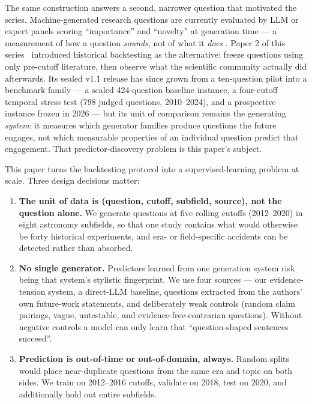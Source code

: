 \documentclass[11pt]{article}
\begin{document}
The same construction answers a second, narrower question that motivated the
series. Machine-generated research questions are currently evaluated by LLM
or expert panels scoring ``importance'' and ``novelty'' at generation time
--- a measurement of how a question \emph{sounds}, not of what it
\emph{does} \cite{si2024}. Paper 2 of this series~\cite{paper2} introduced
historical backtesting as the alternative: freeze questions using only
pre-cutoff literature, then
observe what the scientific community actually did afterwards. Its
sealed v1.1 release has since grown from a ten-question pilot into a
benchmark family --- a scaled 424-question baseline instance, a
four-cutoff temporal stress test (798 judged questions, 2010--2024), and
a prospective instance frozen in 2026 --- but its unit of comparison
remains the generating \emph{system}: it measures which generator
families produce questions the future engages, not which measurable
properties of an individual question predict that engagement. That
predictor-discovery problem is this paper's subject.

This paper turns the backtesting protocol into a supervised-learning
problem at scale. Three design decisions matter:

\begin{enumerate}
  \item \textbf{The unit of data is (question, cutoff, subfield, source),
    not the question alone.} We generate questions at five rolling
    cutoffs (2012--2020) in eight astronomy subfields, so that one study
    contains what would otherwise be forty historical experiments, and
    era- or field-specific accidents can be detected rather than
    absorbed.
  \item \textbf{No single generator.} Predictors learned from one
    generation system risk being that system's stylistic fingerprint. We
    use four sources --- our evidence-tension system, a direct-LLM
    baseline, questions extracted from the authors' own future-work
    statements, and deliberately weak controls (random claim pairings,
    vague, untestable, and evidence-free-contrarian questions). Without
    negative controls a model can only learn that ``question-shaped
    sentences succeed''.
  \item \textbf{Prediction is out-of-time or out-of-domain, always.}
    Random splits would place near-duplicate questions from the same era
    and topic on both sides. We train on 2012--2016 cutoffs, validate on
    2018, test on 2020, and additionally hold out entire subfields.
\end{enumerate}
\end{document}
